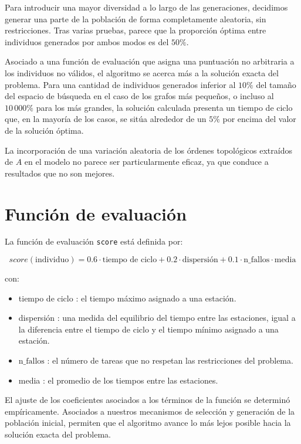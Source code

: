 \documentclass[12pt,a4paper]{report}
\begin{document}
Para introducir una mayor diversidad a lo largo de las generaciones, decidimos generar una parte de la población de forma completamente aleatoria, sin restricciones. Tras varias pruebas, parece que la proporción óptima entre individuos generados por ambos modos es del $50\%$.

Asociado a una función de evaluación que asigna una puntuación no arbitraria a los individuos no válidos, el algoritmo se acerca más a la solución exacta del problema. Para una cantidad de individuos generados inferior al $10\%$ del tamaño del espacio de búsqueda en el caso de los grafos más pequeños, o incluso al $10\,000\%$ para los más grandes, la solución calculada presenta un tiempo de ciclo que, en la mayoría de los casos, se sitúa alrededor de un $5\%$ por encima del valor de la solución óptima.

La incorporación de una variación aleatoria de los órdenes topológicos extraídos de $A$ en el modelo no parece ser particularmente eficaz, ya que conduce a resultados que no son mejores.

\section{Función de evaluación}

La función de evaluación \texttt{score} está definida por:

\[
score(\text{individuo}) = 0.6 \cdot \text{tiempo de ciclo} + 0.2 \cdot \text{dispersión} + 0.1 \cdot \text{n\_fallos} \cdot \text{media}
\]
\vspace{0.5cm}

con:

\begin{itemize}
\item tiempo de ciclo : el tiempo máximo asignado a una estación.
\item dispersión : una medida del equilibrio del tiempo entre las estaciones,
igual a la diferencia entre el tiempo de ciclo y el tiempo mínimo asignado a una estación.
\item $\text{n\_fallos}$ : el número de tareas que no respetan las restricciones del problema.
\item media : el promedio de los tiempos entre las estaciones.
\end{itemize}

El ajuste de los coeficientes asociados a los términos de la función se determinó empíricamente. Asociados a nuestros mecanismos de selección y generación de la población inicial, permiten que el algoritmo avance lo más lejos posible hacia la solución exacta del problema.
\end{document}
